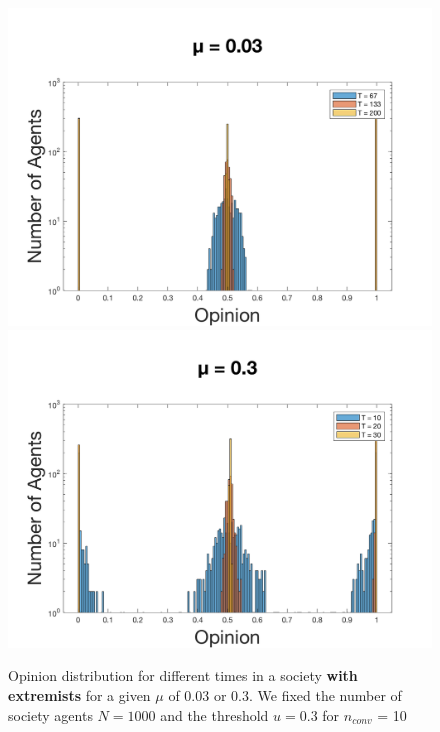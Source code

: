 \documentclass[11pt]{article}
\begin{document}
\begin{figure}[!htb]
  \includegraphics[width=\linewidth]{gen_plot_2017121418225017531e+01.png}
\endminipage\hfill
{}
  \includegraphics[width=\linewidth]{gen_plot_2017121418225354249e+01.png}
\endminipage
\caption{Opinion distribution for different times in a society \textbf{with extremists} for a given $\mu$ of 0.03 or 0.3. We fixed the number of society agents $N = 1000$ and the threshold $u = 0.3$ for $n_{conv}$ = 10}
\label{fig:muwithextremists}
\end{figure}
\end{document}
